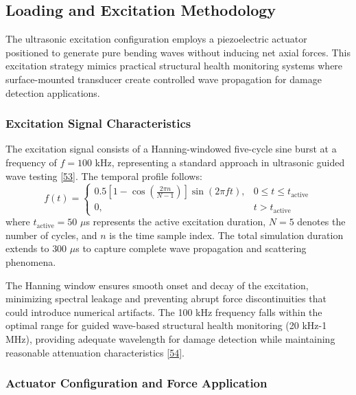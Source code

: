 \documentclass[12pt,a4paper]{report}
\begin{document}
\subsection{Loading and Excitation Methodology}

\label{sec:excitation_methodology}

The ultrasonic excitation configuration employs a piezoelectric actuator positioned to generate pure bending waves without inducing net axial forces. This excitation strategy mimics practical structural health monitoring systems where surface-mounted transducer create controlled wave propagation for damage detection applications.

\subsubsection{Excitation Signal Characteristics}

The excitation signal consists of a Hanning-windowed five-cycle sine burst at a frequency of $f = 100$ kHz, representing a standard approach in ultrasonic guided wave testing \href{https://www.sciencedirect.com/science/article/pii/S0020740322004921}{[53]}. The temporal profile follows:
\begin{equation}
f(t) = \begin{cases}
0.5\left[1 - \cos\left(\frac{2\pi n}{N-1}\right)\right] \sin(2\pi f t), & 0 \leq t \leq t_{\text{active}} \\
0, & t > t_{\text{active}}
\end{cases}
\end{equation}
where $t_{\text{active}} = 50$ $\mu$s represents the active excitation duration, $N = 5$ denotes the number of cycles, and $n$ is the time sample index. The total simulation duration extends to $300$ $\mu$s to capture complete wave propagation and scattering phenomena.

The Hanning window ensures smooth onset and decay of the excitation, minimizing spectral leakage and preventing abrupt force discontinuities that could introduce numerical artifacts. The 100 kHz frequency falls within the optimal range for guided wave-based structural health monitoring (20 kHz-1 MHz), providing adequate wavelength for damage detection while maintaining reasonable attenuation characteristics \href{https://royalsocietypublishing.org/doi/abs/10.1098/rspa.2007.0048}{[54]}.

\subsubsection{Actuator Configuration and Force Application}
\end{document}
